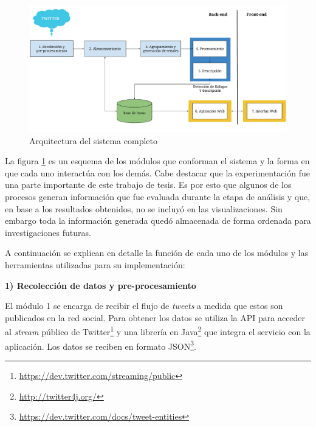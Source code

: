 \begin{figure}[h]
	\centering
	\includegraphics[width=\linewidth]{imagenes/Arquitectura.pdf}
	\caption{Arquitectura del sistema completo}
	\label{img:arquitectura}
\end{figure}

La figura \ref{img:arquitectura} es un esquema de los módulos que conforman el sistema y la forma en que cada uno interactúa con los demás. 
%
Cabe destacar que la experimentación fue una parte importante de este trabajo de tesis. Es por esto que algunos de los procesos generan información que fue evaluada durante la etapa de análisis y que, en base a los resultados obtenidos, no se incluyó en las visualizaciones. 
%
Sin embargo toda la información generada quedó almacenada de forma ordenada para investigaciones futuras. 


A continuación se explican en detalle la función de cada uno de los módulos y las herramientas utilizadas para su implementación: 


\noindent\textbf{1) Recolección de datos y pre-procesamiento}

El módulo 1 se encarga de recibir el flujo de \textit{tweets} a medida que estos son publicados en la red social. 
%
Para obtener los datos se utiliza la API para acceder al \textit{stream} público de Twitter\footnote{\url{https://dev.twitter.com/streaming/public}} y una librería en Java\footnote{\url{http://twitter4j.org/}} que integra el servicio con la aplicación.
%
Los datos se reciben en formato JSON\footnote{\url{https://dev.twitter.com/docs/tweet-entities}}.

